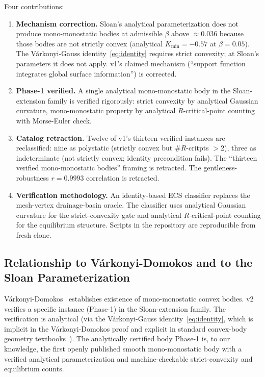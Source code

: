 \documentclass[11pt,a4paper]{article}
\begin{document}
Four contributions:
\begin{enumerate}[nosep]
\item \textbf{Mechanism correction.} Sloan's analytical
  parameterization does not produce mono-monostatic bodies at
  admissible $\beta$ above $\approx 0.036$ because those bodies are
  not strictly convex (analytical $K_{\min} = -0.57$ at $\beta = 0.05$). The
  V\'arkonyi-Gauss identity~\eqref{eq:identity} requires strict
  convexity; at Sloan's parameters it does not apply. v1's claimed
  mechanism (``support function integrates global surface
  information'') is corrected.
\item \textbf{Phase-1 verified.} A single analytical mono-monostatic
  body in the Sloan-extension family is verified rigorously:
  strict convexity by analytical Gaussian curvature, mono-monostatic
  property by analytical $R$-critical-point counting with
  Morse-Euler check.
\item \textbf{Catalog retraction.} Twelve of v1's thirteen verified
  instances are reclassified: nine as polystatic
  (strictly convex but $\#R$-critpts $> 2$), three as indeterminate
  (not strictly convex; identity precondition fails). The
  ``thirteen verified mono-monostatic bodies'' framing is retracted.
  The gentleness-robustness $r = 0.9993$ correlation is retracted.
\item \textbf{Verification methodology.} An identity-based ECS
  classifier replaces the mesh-vertex drainage-basin oracle. The
  classifier uses analytical Gaussian curvature for the
  strict-convexity gate and analytical $R$-critical-point counting
  for the equilibrium structure. Scripts in the repository are
  reproducible from fresh clone.
\end{enumerate}

\subsection{Relationship to V\'arkonyi-Domokos and to the Sloan
Parameterization}

V\'arkonyi-Domokos~\cite{varkonyi2006} establishes existence of
mono-monostatic convex bodies. v2 verifies a specific instance
(Phase-1) in the Sloan-extension family. The verification is
analytical (via the V\'arkonyi-Gauss identity~\eqref{eq:identity},
which is implicit in the V\'arkonyi-Domokos proof and explicit in
standard convex-body geometry textbooks~\cite{schneider2014}). The
analytically certified body Phase-1 is, to our knowledge, the first
openly published smooth mono-monostatic body with a verified
analytical parameterization and machine-checkable strict-convexity
and equilibrium counts.
\end{document}
